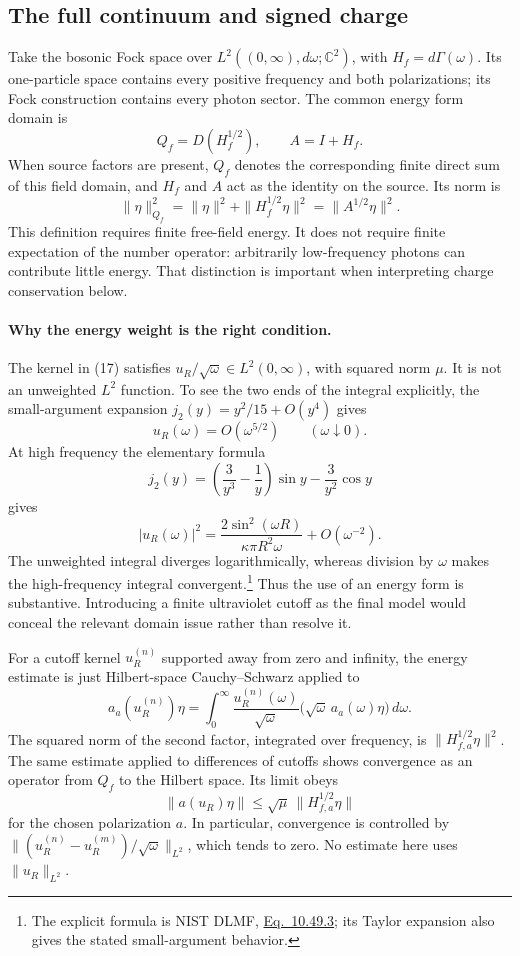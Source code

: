 \documentclass[10pt,twocolumn,letterpaper]{article}
\begin{document}
\subsection{The full continuum and signed charge}
Take the bosonic Fock space over
$L^2((0,\infty),d\omega;\mathbb C^2)$, with
$H_f=d\Gamma(\omega)$.  Its one-particle space contains every positive
frequency and both polarizations; its Fock construction contains every
photon sector.  The common energy form domain is
\begin{equation}
Q_f=D(H_f^{1/2}),\qquad A=I+H_f.\tag{18}
\end{equation}
When source factors are present, $Q_f$ denotes the corresponding finite
direct sum of this field domain, and $H_f$ and $A$ act as the identity on
the source.  Its norm is
\[
\|\eta\|_{Q_f}^2
=\|\eta\|^2+\|H_f^{1/2}\eta\|^2
=\|A^{1/2}\eta\|^2.
\]
This definition requires finite free-field energy.  It does not require
finite expectation of the number operator: arbitrarily low-frequency
photons can contribute little energy.  That distinction is important
when interpreting charge conservation below.

\paragraph{Why the energy weight is the right condition.}
The kernel in (17) satisfies
$u_R/\sqrt\omega\in L^2(0,\infty)$, with squared norm $\mu$.
It is not an unweighted $L^2$ function.  To see the two ends of the
integral explicitly, the small-argument expansion
$j_2(y)=y^2/15+O(y^4)$ gives
\[
u_R(\omega)=O(\omega^{5/2})
\qquad(\omega\downarrow0).
\]
At high frequency the elementary formula
\[
j_2(y)=\left(\frac{3}{y^3}-\frac1y\right)\sin y
-\frac{3}{y^2}\cos y
\]
gives
\[
|u_R(\omega)|^2
=\frac{2\sin^2(\omega R)}{\kappa\pi R^2\omega}
+O(\omega^{-2}).
\]
The unweighted integral diverges logarithmically, whereas division by
$\omega$ makes the high-frequency integral convergent.\footnote{The
explicit formula is NIST DLMF,
\href{https://dlmf.nist.gov/10.49.E3}{Eq.~10.49.3}; its Taylor expansion
also gives the stated small-argument behavior.}
Thus the use of an energy form is substantive.  Introducing a finite
ultraviolet cutoff as the final model would conceal the relevant domain
issue rather than resolve it.

For a cutoff kernel $u_R^{(n)}$ supported away from zero and infinity,
the energy estimate is just Hilbert-space Cauchy--Schwarz applied to
\[
a_a(u_R^{(n)})\eta
=\int_0^\infty
\frac{u_R^{(n)}(\omega)}{\sqrt\omega}
\bigl(\sqrt\omega\,a_a(\omega)\eta\bigr)\,d\omega.
\]
The squared norm of the second factor, integrated over frequency, is
$\|H_{f,a}^{1/2}\eta\|^2$.  The
same estimate applied to differences of cutoffs shows convergence as an
operator from $Q_f$ to the Hilbert space.  Its limit obeys
\begin{equation}
\|a(u_R)\eta\|\le\sqrt\mu\,\|H_{f,a}^{1/2}\eta\|\tag{19}
\end{equation}
for the chosen polarization $a$.  In particular, convergence is
controlled by
$\|(u_R^{(n)}-u_R^{(m)})/\sqrt\omega\|_{L^2}$, which tends to zero.
No estimate here uses $\|u_R\|_{L^2}$.
\end{document}
